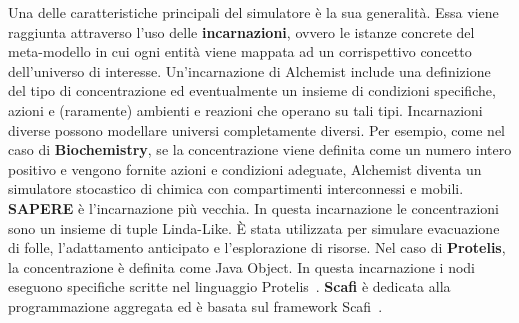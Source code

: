 \documentclass[12pt,a4paper,openright,twoside]{book}
\begin{document}
Una delle caratteristiche principali del simulatore è la sua generalità. Essa viene raggiunta attraverso l'uso delle \textbf{incarnazioni}, ovvero le istanze concrete del meta-modello in cui ogni entità viene mappata ad un corrispettivo concetto dell'universo di interesse. 
Un'incarnazione di Alchemist include una definizione del tipo di concentrazione ed eventualmente un insieme di condizioni specifiche, azioni e (raramente) ambienti e reazioni che operano su tali tipi. 
Incarnazioni diverse possono modellare universi completamente diversi. Per esempio, come nel caso di \textbf{Biochemistry}, se la concentrazione viene definita come un numero intero positivo e vengono fornite azioni e condizioni adeguate, Alchemist diventa un simulatore stocastico di chimica con compartimenti interconnessi e mobili.
\textbf{SAPERE} è l'incarnazione più vecchia. In questa incarnazione le concentrazioni sono un insieme di tuple Linda-Like. È stata utilizzata per simulare evacuazione di folle, l'adattamento anticipato e l'esplorazione di risorse.  
Nel caso di \textbf{Protelis}, la concentrazione è definita come Java Object. In questa incarnazione i nodi eseguono specifiche scritte nel linguaggio Protelis~\cite{DBLP:conf/sac/PianiniVB15}. \textbf{Scafi} è dedicata alla programmazione aggregata ed è basata sul framework Scafi~\cite{DBLP:journals/softx/CasadeiVAP22}.
\end{document}
